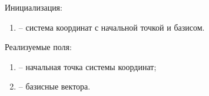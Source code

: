 	\noindent Инициализация:
	\begin{enumerate}
		\item {} -- система координат с начальной точкой и базисом.
	\end{enumerate}

	\noindent Реализуемые поля:
	\begin{enumerate}
		\item {} -- начальная точка системы координат;
		\item {} -- базисные вектора.
	\end{enumerate}
	